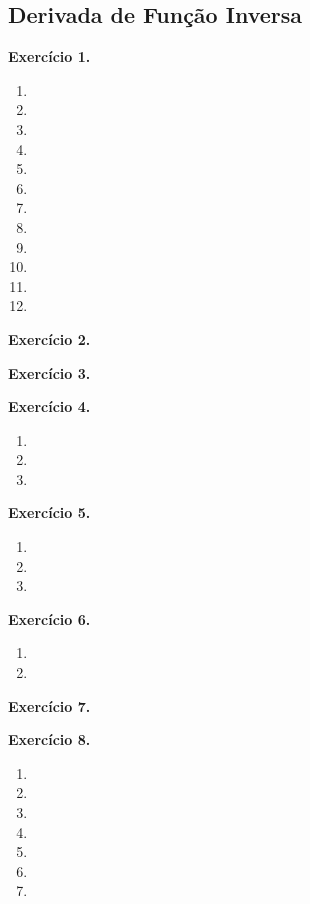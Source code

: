 \documentclass[12pt,a4paper]{article}
\begin{document}
\subsection{Derivada de Função Inversa}

\vspace{0.5cm}
\noindent\textbf{Exercício 1.}
\begin{enumerate}
    \renewcommand{\theenumi}{\alph{enumi}}
    \renewcommand{\labelenumi}{\theenumi)}
    \item 
    \item 
    \item 
    \item 
    \item 
    \item 
    \item 
    \item 
    \item 
    \item 
    \item 
    \item 
\end{enumerate}

\vspace{0.5cm}
\noindent\textbf{Exercício 2.}

\vspace{0.5cm}
\noindent\textbf{Exercício 3.}

\vspace{0.5cm}
\noindent\textbf{Exercício 4.}
\begin{enumerate}
    \renewcommand{\theenumi}{\alph{enumi}}
    \renewcommand{\labelenumi}{\theenumi)}
    \item 
    \item 
    \item 
\end{enumerate}

\vspace{0.5cm}
\noindent\textbf{Exercício 5.}
\begin{enumerate}
    \renewcommand{\theenumi}{\alph{enumi}}
    \renewcommand{\labelenumi}{\theenumi)}
    \item 
    \item 
    \item 
\end{enumerate}

\vspace{0.5cm}
\noindent\textbf{Exercício 6.}
\begin{enumerate}
    \renewcommand{\theenumi}{\alph{enumi}}
    \renewcommand{\labelenumi}{\theenumi)}
    \item 
    \item 
\end{enumerate}

\vspace{0.5cm}
\noindent\textbf{Exercício 7.}

\vspace{0.5cm}
\noindent\textbf{Exercício 8.}
\begin{enumerate}
    \renewcommand{\theenumi}{\alph{enumi}}
    \renewcommand{\labelenumi}{\theenumi)}
    \item 
    \item 
    \item 
    \item 
    \item 
    \item 
    \item 
\end{enumerate}
\end{document}
